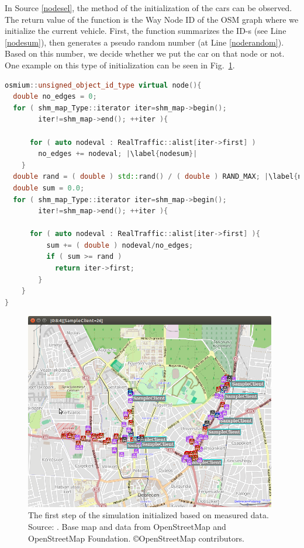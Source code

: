 \documentclass[b5paper,12pt]{report}
\theoremstyle{definition}
\begin{document}
In Source \ref{nodesel}, the method of the initialization of the cars can be observed. The return value of the function is the Way Node ID of the OSM graph where we initialize the current vehicle. First, the function summarizes the ID-s (see Line \ref{nodesum}), then generates a pseudo random number (at Line \ref{noderandom}). Based on this number, we decide whether we put the car on that node or not. One example on this type of initialization can be seen in Fig.~\ref{simulinit}.

\begin{lstlisting}[language=C++,caption=Initialization., label=nodesel, escapechar={|}]
osmium::unsigned_object_id_type virtual node(){
  double no_edges = 0;
  for ( shm_map_Type::iterator iter=shm_map->begin();
        iter!=shm_map->end(); ++iter ){

      for ( auto nodeval : RealTraffic::alist[iter->first] )
        no_edges += nodeval; |\label{nodesum}|
    }
  double rand = ( double ) std::rand() / ( double ) RAND_MAX; |\label{noderandom}|
  double sum = 0.0;
  for ( shm_map_Type::iterator iter=shm_map->begin();
        iter!=shm_map->end(); ++iter ){

      for ( auto nodeval : RealTraffic::alist[iter->first] ){
          sum += ( double ) nodeval/no_edges;
          if ( sum >= rand )
            return iter->first;
        }
    }
}
\end{lstlisting}

\begin{figure}[ht!]
\centerline{
\includegraphics[width=11cm]{img/ut3.png}}
\caption{The first step of the simulation initialized based on measured data. Source: \cite{infocomjournal}. Base map and data from OpenStreetMap and OpenStreetMap Foundation. \copyright OpenStreetMap contributors.}
\label{simulinit}
\end{figure}
\end{document}
